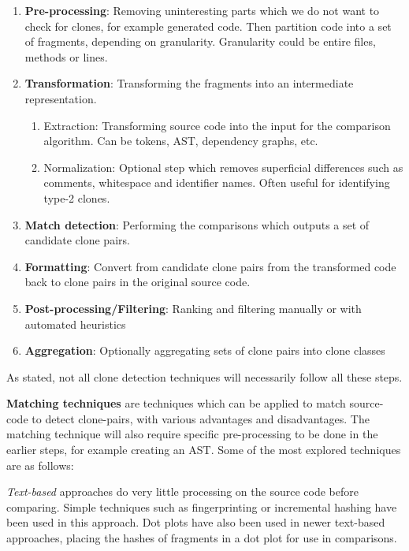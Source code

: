 \documentclass[12pt]{article}
\begin{document}
\begin{enumerate}
	\item \textbf{Pre-processing}: Removing uninteresting parts which we do not want to
	      check for clones, for example generated code. Then partition code into a set of
	      fragments, depending on granularity. Granularity could be entire files, methods or lines.
	\item \textbf{Transformation}: Transforming the fragments into an intermediate representation.
	      \begin{enumerate}
		      \item Extraction: Transforming source code into the input for the comparison
		            algorithm. Can be tokens, AST, dependency graphs, etc.
		      \item Normalization: Optional step which removes superficial differences such as
		            comments, whitespace and identifier names. Often useful for identifying type-2
		            clones.
	      \end{enumerate}
	\item \textbf{Match detection}: Performing the comparisons which outputs a set of
	      candidate clone pairs.
	\item \textbf{Formatting}: Convert from candidate clone pairs from the transformed
	      code back to clone pairs in the original source code.
	\item \textbf{Post-processing/Filtering}: Ranking and filtering manually or with
	      automated heuristics
	\item \textbf{Aggregation}: Optionally aggregating sets of clone pairs into clone classes
\end{enumerate}

As stated, not all clone detection techniques will necessarily follow all these steps.

\textbf{Matching techniques} are techniques which can be applied to match source-code to
detect clone-pairs, with various advantages and disadvantages. The matching technique will
also require specific pre-processing to be done in the earlier steps, for example creating an
AST. Some of the most explored techniques are as follows\cite{ComparisonAndEvaluationOfTechniques}:

\textit{Text-based} approaches do very little processing on the source code before
comparing. Simple techniques such as fingerprinting or incremental hashing have been used
in this approach. Dot plots have also been used in newer text-based approaches, placing
the hashes of fragments in a dot plot for use in comparisons.
\end{document}
